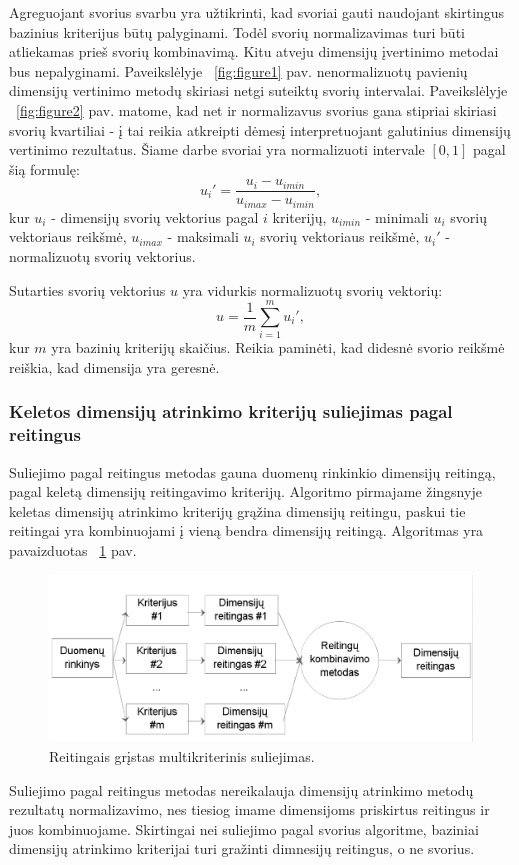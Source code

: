Agreguojant svorius svarbu yra užtikrinti, kad svoriai gauti naudojant
skirtingus bazinius kriterijus būtų palyginami. Todėl svorių normalizavimas
turi būti atliekamas prieš svorių kombinavimą.  Kitu
atveju dimensijų įvertinimo metodai bus nepalyginami. Paveikslėlyje ~\ref{fig:figure1} pav.
nenormalizuotų pavienių dimensijų vertinimo metodų skiriasi netgi suteiktų
svorių intervalai. Paveikslėlyje ~\ref{fig:figure2} pav. matome,
kad net ir normalizavus svorius gana stipriai skiriasi svorių kvartiliai - į 
tai reikia atkreipti dėmesį interpretuojant galutinius dimensijų vertinimo 
rezultatus. Šiame darbe svoriai yra 
normalizuoti intervale $[0, 1]$ pagal šią formulę:
\begin{equation}
 u_i'=\frac{u_i - u_{i min}}{u_{i max} - u_{i min}}, 
\end{equation}
kur $u_i$ - dimensijų svorių vektorius pagal $i$ kriterijų, 
$u_{i min}$ - minimali $u_i$ svorių vektoriaus reikšmė,
$u_{i max}$ - maksimali $u_i$ svorių vektoriaus reikšmė,
$u_i'$ - normalizuotų svorių vektorius.

Sutarties svorių vektorius $u$ yra vidurkis normalizuotų svorių vektorių:
\begin{equation}
 u = \frac{1}{m}\sum_{i=1}^m u_i',
\end{equation}
kur $m$ yra bazinių kriterijų skaičius. Reikia paminėti, kad didesnė svorio
reikšmė reiškia, kad dimensija yra geresnė.

\subsubsection{Keletos dimensijų atrinkimo kriterijų suliejimas pagal reitingus}

Suliejimo pagal reitingus metodas gauna duomenų rinkinkio dimensijų reitingą,
pagal keletą dimensijų reitingavimo kriterijų. Algoritmo pirmajame žingsnyje
keletas dimensijų atrinkimo kriterijų grąžina dimensijų reitingu, paskui tie
reitingai yra kombinuojami į vieną bendra dimensijų reitingą.  Algoritmas yra
pavaizduotas ~\ref{fig:figure5} pav.
\begin{figure}
 \centering
 \includegraphics[width=1\textwidth]{images/ranking_based_multicriterion_fusion_2.png}
 \caption{Reitingais grįstas multikriterinis suliejimas.}
 \label{fig:figure5}
\end{figure}
Suliejimo pagal reitingus metodas nereikalauja dimensijų atrinkimo metodų 
rezultatų normalizavimo, nes tiesiog imame dimensijoms priskirtus reitingus ir 
juos kombinuojame. Skirtingai nei suliejimo pagal svorius algoritme, baziniai 
dimensijų atrinkimo kriterijai turi gražinti dimnesijų reitingus, o ne svorius.

